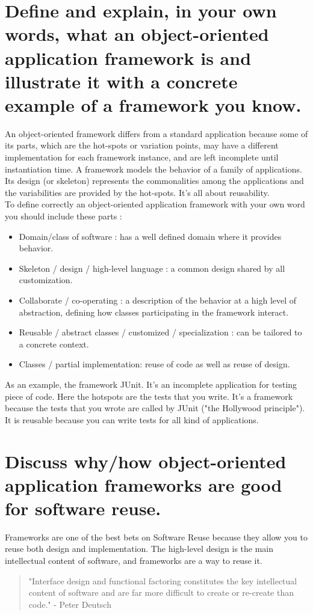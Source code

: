 \section{Define and explain, in your own words, what an object-oriented application framework is
and illustrate it with a concrete example of a framework you know.}

An object-oriented framework differs from a standard application because some of its parts, which are the hot-spots or variation points, may have a different implementation for each framework instance, and are left incomplete until instantiation time. A framework models the behavior of a family of applications. Its design (or skeleton) represents the commonalities among the applications and the variabilities are provided by the hot-spots. It's all about reusability.\\

To define correctly an object-oriented application framework with your own word you should include these parts :
\begin{itemize}
\item Domain/class of software : has a well defined domain where it provides behavior.
\item Skeleton / design / high-level language : a common design shared by all customization.
\item Collaborate / co-operating : a description of the behavior at a high level of abstraction, defining how classes participating in the framework interact.
\item Reusable / abstract classes / customized / specialization : can be tailored to a concrete context.
\item Classes / partial implementation: reuse of code as well as reuse of design.
\end{itemize}

As an example, the framework JUnit. It's an incomplete application for testing piece of code. Here the hotspots are the tests that you write. It's a framework because the tests that you wrote are called by JUnit ("the Hollywood principle"). It is reusable because you can write tests for all kind of applications.

\section{Discuss why/how object-oriented application frameworks are good for software reuse.}
Frameworks are one of the best bets on Software Reuse because they allow you to reuse both design and implementation.
The high-level design is the main intellectual content of software, and frameworks are a way to reuse it.
\begin{quote}
"Interface design and functional factoring constitutes the key intellectual content of software and are far more difficult to create or re-create than code." - Peter Deutsch
\end{quote}

